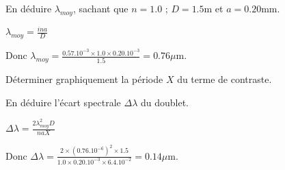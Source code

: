 




\begin{enonce}
	En déduire $\lambda_{moy}$, sachant que $n=\num{1.0}$ ; $D=\num{1.5}\si{\metre}$ et $a=\num{0.20}\si{\milli\metre}$. 
\end{enonce}


\begin{corrige}
	$\lambda_{moy}=\frac{ina}{D}$

	Donc $\lambda_{moy}=\frac{\num{0.57}.10^{-3} \times \num{1.0} \times \num{0.20}.10^{-3}}{\num{1.5}}=\num{0.76}\si{\mu\metre}$.
\end{corrige}




\begin{enonce}
Déterminer graphiquement la période $X$ du terme de contraste.
\end{enonce}







\begin{enonce}
En déduire l'écart spectrale $\Delta \lambda$ du doublet.
\end{enonce}
	
	
\begin{corrige}
	$\Delta \lambda=\frac{2\lambda_{moy}^2 D}{naX}$

	Donc $\Delta \lambda=\frac{2 \times (\num{0.76}.10^{-6})^2 \times \num{1.5}}{\num{1.0}  \times \num{0.20}.10^{-3} \times \num{6.4}.10^{-2}}=\num{0.14}\si{\mu\metre}$.
\end{corrige}
	
